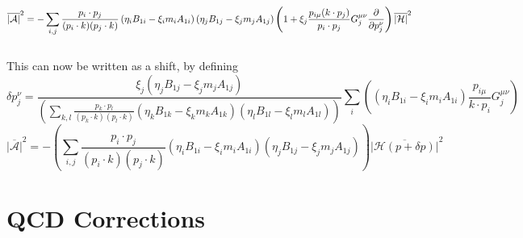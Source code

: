 \documentclass{article}
\begin{document}
\begin{equation*}
	\overline{|\mathcal{A}|}^2 = -\sum_{i,j}\frac{p_{i}\cdot p_j}{(p_i\cdot k)(p_j\cdot k)}\left(\eta_iB_{1i}-\xi_im_iA_{1i}\right)\left(\eta_jB_{1j}-\xi_jm_jA_{1j}\right)\left(1+\xi_j\frac{p_{i\mu}(k\cdot p_j)}{p_i \cdot p_j}G^{\mu\nu}_j\pdv{p_j^\nu}\right) \overline{|\mathcal{H}|}^2
\end{equation*}
\\
This can now be written as a shift, by defining
\begin{equation}
	\delta p_j^\nu = \frac{\xi_j \left(\eta_jB_{1j}-\xi_jm_jA_{1j}\right)}{\left(\sum_{k,l}\frac{p_{k}\cdot p_l}{(p_k\cdot k)(p_l\cdot k)}\left(\eta_kB_{1k}-\xi_km_kA_{1k}\right)\left(\eta_lB_{1l}-\xi_lm_lA_{1l}\right)\right)}\sum_i \left(\left(\eta_iB_{1i}-\xi_im_iA_{1i}\right)\frac{p_{i\mu}}{k\cdot p_i}G^{\mu\nu}_j\right)
\end{equation}
\begin{equation*}
	\overline{|\mathcal{A}|}^2 = -\left(\sum_{i,j}\frac{p_{i}\cdot p_j}{(p_i\cdot k)(p_j\cdot k)}\left(\eta_iB_{1i}-\xi_im_iA_{1i}\right)\left(\eta_jB_{1j}-\xi_jm_jA_{1j}\right)\right) \overline{|\mathcal{H}(p+\delta p)|}^2
\end{equation*}

\section{QCD Corrections}
\end{document}
